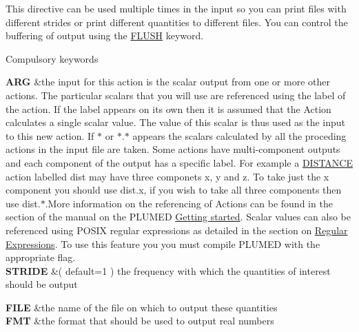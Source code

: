This directive can be used multiple times in the input so you can print files with different strides or print different quantities to different files. You can control the buffering of output using the \hyperlink{FLUSH}{F\+L\+U\+S\+H} keyword.

\begin{DoxyParagraph}{Compulsory keywords}

\end{DoxyParagraph}
\begin{TabularC}{2}
\hline
{\bfseries  A\+R\+G } &the input for this action is the scalar output from one or more other actions. The particular scalars that you will use are referenced using the label of the action. If the label appears on its own then it is assumed that the Action calculates a single scalar value. The value of this scalar is thus used as the input to this new action. If $\ast$ or $\ast$.$\ast$ appears the scalars calculated by all the proceding actions in the input file are taken. Some actions have multi-\/component outputs and each component of the output has a specific label. For example a \hyperlink{DISTANCE}{D\+I\+S\+T\+A\+N\+C\+E} action labelled dist may have three componets x, y and z. To take just the x component you should use dist.\+x, if you wish to take all three components then use dist.$\ast$.More information on the referencing of Actions can be found in the section of the manual on the P\+L\+U\+M\+E\+D \hyperlink{_syntax}{Getting started}. Scalar values can also be referenced using P\+O\+S\+I\+X regular expressions as detailed in the section on \hyperlink{Regex}{Regular Expressions}. To use this feature you you must compile P\+L\+U\+M\+E\+D with the appropriate flag.   \\
{\bfseries  S\+T\+R\+I\+D\+E } &( default=1 ) the frequency with which the quantities of interest should be output   \\
\end{TabularC}


\begin{TabularC}{2}
\hline
{\bfseries  F\+I\+L\+E } &the name of the file on which to output these quantities   \\
{\bfseries  F\+M\+T } &the format that should be used to output real numbers  

\\
\end{TabularC}


